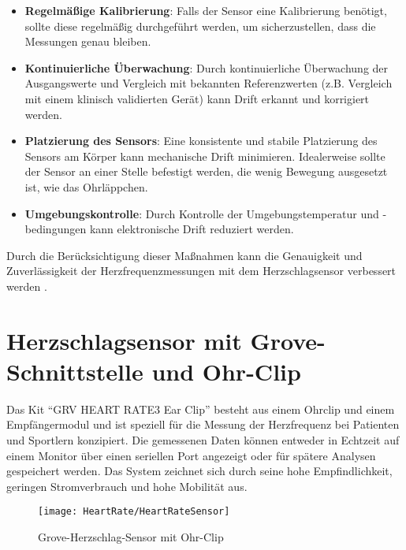 {    \begin{itemize}[label={}]
        \item \textbf{Regelmäßige Kalibrierung}: Falls der Sensor eine Kalibrierung benötigt, sollte diese regelmäßig durchgeführt werden, um sicherzustellen, dass die Messungen genau bleiben.
        \item \textbf{Kontinuierliche Überwachung}: Durch kontinuierliche Überwachung der Ausgangswerte und Vergleich mit bekannten Referenzwerten (z.B. Vergleich mit einem klinisch validierten Gerät) kann Drift erkannt und korrigiert werden.
        \item \textbf{Platzierung des Sensors}: Eine konsistente und stabile Platzierung des Sensors am Körper kann mechanische Drift minimieren. Idealerweise sollte der Sensor an einer Stelle befestigt werden, die wenig Bewegung ausgesetzt ist, wie das Ohrläppchen.
        \item \textbf{Umgebungskontrolle}: Durch Kontrolle der Umgebungstemperatur und -bedingungen kann elektronische Drift reduziert werden.
    \end{itemize}
    
    Durch die Berücksichtigung dieser Maßnahmen kann die Genauigkeit und Zuverlässigkeit der Herzfrequenzmessungen mit dem Herzschlagsensor verbessert werden \cite{Traenkler:2014}.
    
}


\section{Herzschlagsensor mit Grove-Schnittstelle und Ohr-Clip}

Das Kit ``GRV HEART RATE3 Ear Clip'' besteht aus einem Ohrclip und einem Empfängermodul und ist speziell für die Messung der Herzfrequenz bei Patienten und Sportlern konzipiert. Die gemessenen Daten können entweder in Echtzeit auf einem Monitor über einen seriellen Port angezeigt oder für spätere Analysen gespeichert werden. Das System zeichnet sich durch seine hohe Empfindlichkeit, geringen Stromverbrauch und hohe Mobilität aus. 

\begin{figure}[h]
    \begin{center}
        \texttt{[image: HeartRate/HeartRateSensor]}
        \caption{Grove-Herzschlag-Sensor mit Ohr-Clip\cite{Seeed:2015}}
        \label{fig:Herzschlagsensor}
    \end{center}
\end{figure}


